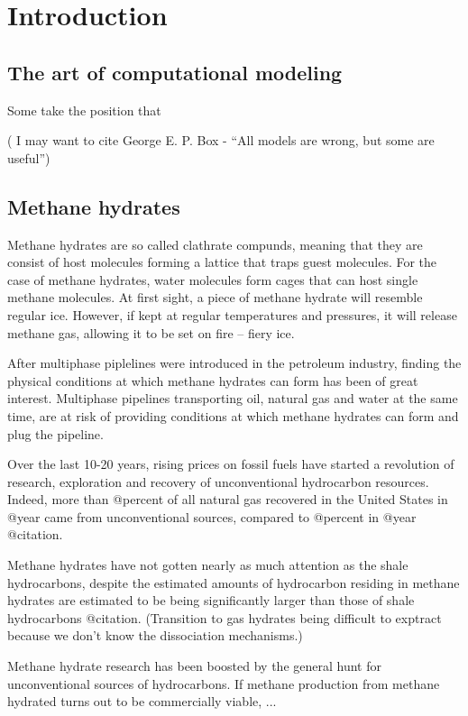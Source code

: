 \chapter{Introduction}
\section{The art of computational modeling}
Some take the position that 

( I may want to cite George E. P. Box - ``All models are wrong, but some are useful'')

\section{Methane hydrates}
Methane hydrates are so called clathrate compunds, meaning that they are consist of host molecules forming a lattice that traps guest molecules. For the case of methane hydrates, water molecules form cages that can host single methane molecules. At first sight, a piece of methane hydrate will resemble regular ice. However, if kept at regular temperatures and pressures, it will release methane gas, allowing it to be set on fire -- fiery ice. 

After multiphase piplelines were introduced in the petroleum industry, finding the physical conditions at which methane hydrates can form has been of great interest. Multiphase pipelines transporting oil, natural gas and water at the same time, are at risk of providing conditions at which methane hydrates can form and plug the pipeline. 

Over the last 10-20 years, rising prices on fossil fuels have started a revolution of research, exploration and recovery of unconventional hydrocarbon resources. Indeed, more than @percent of all natural gas recovered in the United States in @year came from unconventional sources, compared to @percent in @year @citation. 

Methane hydrates have not gotten nearly as much attention as the shale hydrocarbons, despite the estimated amounts of hydrocarbon residing in methane hydrates are estimated to be being significantly larger than those of shale hydrocarbons @citation. 
(Transition to gas hydrates being difficult to exptract because we don't know the dissociation mechanisms.)

Methane hydrate research has been boosted by the general hunt for unconventional sources of hydrocarbons. If methane production from methane hydrated turns out to be commercially viable, ...

